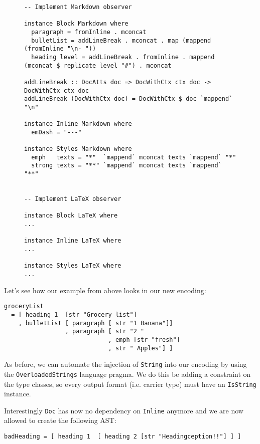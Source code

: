 \begin{figure}
\begin{lstlisting}
-- Implement Markdown observer

instance Block Markdown where
  paragraph = fromInline . mconcat
  bulletList = addLineBreak . mconcat . map (mappend (fromInline "\n- "))
  heading level = addLineBreak . fromInline . mappend (mconcat $ replicate level "#") . mconcat

addLineBreak :: DocAtts doc => DocWithCtx ctx doc -> DocWithCtx ctx doc
addLineBreak (DocWithCtx doc) = DocWithCtx $ doc `mappend` "\n"

instance Inline Markdown where
  emDash = "---"

instance Styles Markdown where
  emph   texts = "*"  `mappend` mconcat texts `mappend` "*"
  strong texts = "**" `mappend` mconcat texts `mappend` "**"


-- Implement LaTeX observer

instance Block LaTeX where
...

instance Inline LaTeX where
...

instance Styles LaTeX where
...
\end{lstlisting}
\end{figure}


\clearpage

Let's see how our example from above looks in our new encoding:

\begin{lstlisting}
groceryList
  = [ heading 1  [str "Grocery list"]
    , bulletList [ paragraph [ str "1 Banana"]]
                 , paragraph [ str "2 "
                             , emph [str "fresh"]
                             , str " Apples"] ]
\end{lstlisting}


As before, we can automate the injection of \texttt{String} into our encoding by
using the \texttt{OverloadedStrings} language pragma. We do this be adding a
constraint on the type classes, so every output format (i.e. carrier type) must
have an \texttt{IsString} instance.

Interestingly \texttt{Doc} has now no dependency on \texttt{Inline} anymore and
we are now allowed to create the following AST:

\begin{lstlisting}
badHeading = [ heading 1  [ heading 2 [str "Headingception!!"] ] ]
\end{lstlisting}

